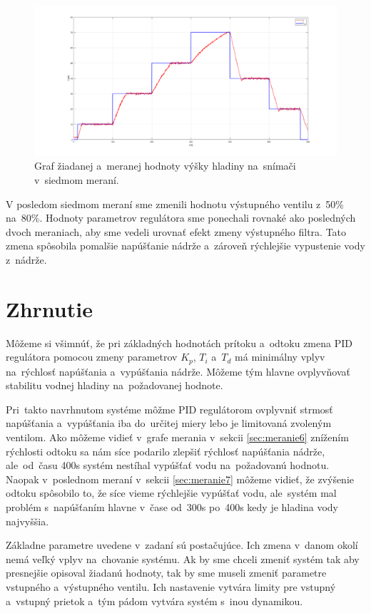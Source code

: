 \documentclass{article}
\begin{document}
\begin{figure}[!htbp]
	\begin{center}
		\includegraphics[width=\textwidth]{./include/meranie7.png}
	\end{center}
	\caption{Graf žiadanej a~meranej hodnoty výšky hladiny na~snímači v~siedmom meraní.}
	\label{fig:m7}
\end{figure}

V posledom siedmom meraní sme zmenili hodnotu výstupného ventilu z~50\% na~80\%. Hodnoty parametrov
regulátora sme ponechali rovnaké ako posledných dvoch meraniach, aby sme vedeli urovnať efekt zmeny
výstupného filtra. Tato zmena spôsobila pomalšie napúšťanie nádrže a~zároveň rýchlejšie vypustenie
vody z~nádrže.

\clearpage

\section{Zhrnutie}
\label{sec:zhrnutie}


Môžeme si všimnúť, že pri základných hodnotách prítoku a~odtoku zmena PID regulátora pomocou zmeny parametrov
$K_p$, $T_i$ a~$T_d$ má minimálny vplyv na~rýchlosť napúšťania a~vypúšťania nádrže. Môžeme tým hlavne
ovplyvňovať stabilitu vodnej hladiny na~požadovanej hodnote.

Pri~takto navrhnutom systéme môžme PID regulátorom ovplyvniť strmosť napúšťania a~vypúšťania iba do~určitej
miery lebo je limitovaná zvoleným ventilom. Ako môžeme vidieť v~grafe merania v~sekcii \ref{sec:meranie6}
znížením rýchlosti odtoku sa nám síce podarilo zlepšiť rýchlosť napúšťania nádrže, ale~od~času 400s systém
nestíhal vypúšťať vodu na~požadovanú hodnotu. Naopak v~poslednom meraní v~sekcii \ref{sec:meranie7} môžeme
vidieť, že zvýšenie odtoku spôsobilo to, že síce vieme rýchlejšie vypúšťať vodu, ale~systém mal problém
s~napúšťaním hlavne v~čase od~300s po~400s kedy je hladina vody najvyššia.

Základne parametre uvedene v~zadaní sú postačujúce. Ich zmena v~danom okolí nemá veľký vplyv na~chovanie
systému. Ak by sme chceli zmeniť systém tak aby presnejšie opisoval žiadanú hodnoty, tak by sme museli
zmeniť parametre vstupného a~výstupného ventilu. Ich nastavenie vytvára limity pre vstupný a~vstupný
prietok a~tým pádom vytvára systém s~inou dynamikou.
\end{document}

